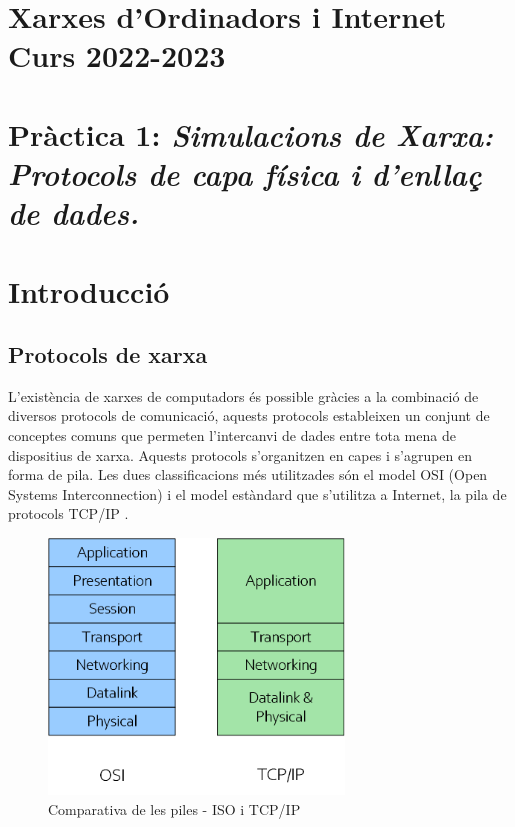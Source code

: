 \documentclass[12pt,a4paper]{article}
\begin{document}
\section*{Xarxes d’Ordinadors i Internet \\ Curs 2022-2023}
\section*{Pràctica 1: \textit{Simulacions de Xarxa: Protocols de capa física i d'enllaç de dades.}}

\vspace*{0.5cm}
\section{Introducció}


\subsection*{Protocols de xarxa}
L'existència de xarxes de computadors és possible gràcies a la combinació de diversos protocols de comunicació, aquests protocols estableixen un conjunt de conceptes comuns que permeten l'intercanvi de dades entre tota mena de dispositius de xarxa. Aquests protocols s'organitzen en capes i s'agrupen en forma de pila. Les dues classificacions més utilitzades són el model OSI (Open Systems Interconnection) \cite{osi} i el model estàndard que s'utilitza a Internet, la pila de protocols TCP/IP \cite{internet}.

\begin{figure}[!ht]
  \begin{center}
    \includegraphics[width=0.7\textwidth]{protocol-stack}
    \caption{Comparativa de les piles - ISO i TCP/IP}
    \label{osi-stack}
  \end{center}
\end{figure}
\end{document}
